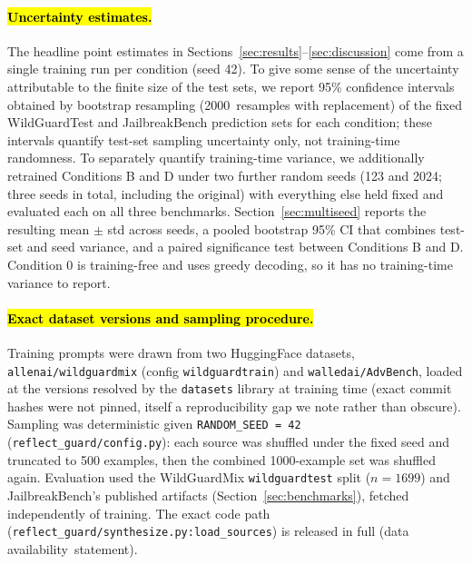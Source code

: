 \documentclass[superintelligence,article,accept,moreauthors]{Definitions/mdpi}
\begin{document}
\paragraph{\hl{Uncertainty estimates.} %
} The headline point estimates in Sections~\ref{sec:results}--\ref{sec:discussion} come from a single training run per condition (seed 42). To give some sense of the uncertainty attributable to the finite size of the test sets, we report 95\% confidence intervals obtained by bootstrap resampling (2000~resamples with replacement) of the fixed WildGuardTest and JailbreakBench prediction sets for each condition; these intervals quantify test-set sampling uncertainty only, not training-time randomness. To separately quantify training-time variance, we additionally retrained Conditions B and D under two further random seeds (123 and 2024; three seeds in total, including the original) with everything else held fixed and evaluated each on all three benchmarks. Section~\ref{sec:multiseed} reports the resulting mean $\pm$ std across seeds, a pooled bootstrap 95\% CI that combines test-set and seed variance, and a paired significance test between Conditions B and D. Condition 0 is training-free and uses greedy decoding, so it has no training-time variance to report.

\paragraph{\hl{Exact dataset versions and sampling procedure.}} Training prompts were drawn from two HuggingFace datasets, \texttt{allenai/wildguardmix} (config \texttt{wildguardtrain}) and \texttt{walledai/AdvBench}, loaded at the versions resolved by the \texttt{datasets} library at training time (exact commit hashes were not pinned, itself a reproducibility gap we note rather than obscure). Sampling was deterministic given \texttt{RANDOM\_SEED = 42} (\texttt{reflect\_guard/config.py}): each source was shuffled under the fixed seed and truncated to 500 examples, then the combined 1000-example set was shuffled again. Evaluation used the WildGuardMix \texttt{wildguardtest} split ($n=1699$) and JailbreakBench's published artifacts (Section~\ref{sec:benchmarks}), fetched independently of training. The exact code path (\texttt{reflect\_guard/synthesize.py:load\_sources}) is released in full (data \mbox{availability statement}).
\end{document}
